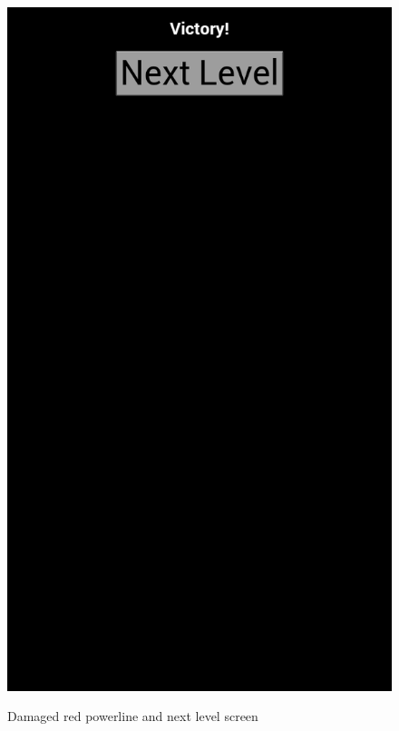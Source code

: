 \begin{figure}[H]
{			\includegraphics[scale=0.18]{pictures/sprint3-screen/nextLevel.png}
		}
		\caption{Damaged red powerline and next level screen}
	\end{figure}

